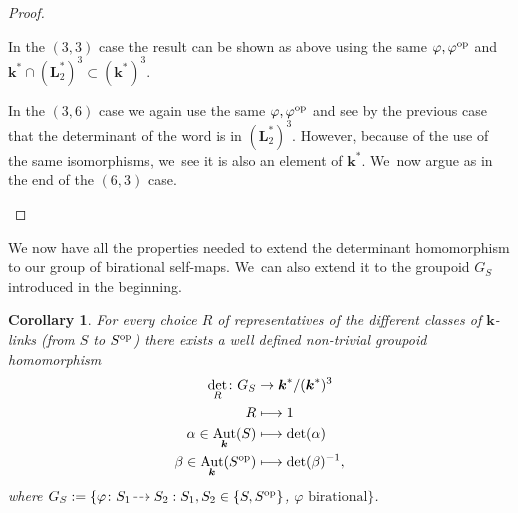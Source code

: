 \documentclass[JEP,XML,SOM,Unicode,NoFloatCountersInSection, NoEqCountersInSection,published]{cedram}
\newcommand{\dradpl}{{\hspace*{-2mm}\begin{tikzcd}[ampersand replacement=\&,column sep = scriptsize]\mbox{}\ar[r,dashed]\&\mbox{}\end{tikzcd}\hspace*{-2mm}}}
\newcommand{\dratst}{{\hspace*{-2.5mm}\begin{tikzcd}[ampersand replacement=\&,column sep = small]\mbox{}\ar[r,dashed]\&\mbox{}\end{tikzcd}\hspace*{-2mm}}}
\let\drascst\dratst
\newcommand{\dra}{\mathchoice{\dradpl}{\dratst}{\drascst}{\drascst}}
\newcommand\mto{\mathchoice{\longmapsto}{\mapsto}{\mapsto}{\mapsto}}
\newcommand{\op}{\textup{op}}
\newtheorem{corollary}[theorem]{Corollary}
\theoremstyle{definition}
\newcommand{\kk}{{\boldsymbol{k}}}
\newcommand{\LL}{{\boldsymbol{L}}}
\DeclareMathOperator{\Aut}{Aut}
\begin{document}
\begin{proof}
\begin{enumerate}
In the $(3,3)$ case the result can be shown as above using the same $\varphi, \varphi^{\op}$ and $\kk^* \cap (\LL_2^{*})^3 \subset (\kk^{*})^3$.

In the $(3,6)$ case we again use the same $\varphi, \varphi^{\op}$ and see by the previous case that the determinant of the word is in $ (\LL_2^{*})^3$. However, because of the use of the same isomorphisms, we~see it is also an element of $\kk^*$. We~now argue as in the end of the $(6,3)$ case.\qedhere
\end{enumerate}
\end{proof}

We now have all the properties needed to extend the determinant homomorphism to our group of birational self-maps. We~can also extend it to the groupoid $G_S$ introduced in the beginning.
\begin{corollary}\label{DetOnBir}
For every choice $R$ of representatives of the different classes of $\kk$-links (from $S$ to $S^{\op}$) there exists a well defined non-trivial groupoid homomorphism
\begin{align*}
\det_R \colon G_S &\to \kk^*/(\kk^*)^3
\\
R &\mto 1
\\
\alpha \in \Aut_{\kk}(S) &\mto \det(\alpha)
\\
\beta \in \Aut_{\kk}(S^{\op}) &\mto \det(\beta)^{-1},
\end{align*}
where $G_S := \{ \varphi \colon S_1 \dra S_2 : S_1,S_2 \in \{ S, S^{\op}\}$, $\varphi \text{ birational}\}$.
\end{corollary}
\end{document}
